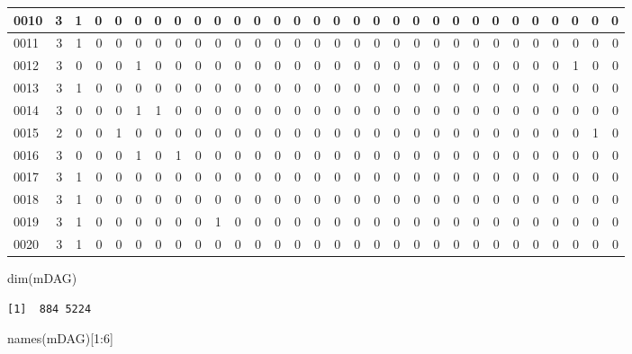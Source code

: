 \documentclass[
  letterpaper,
  DIV=11,
  numbers=noendperiod]{scrreprt}
\newenvironment{Shaded}{\begin{snugshade}}{\end{snugshade}}
\newcommand{\DecValTok}[1]{\textcolor[rgb]{0.68,0.00,0.00}{#1}}
\newcommand{\FunctionTok}[1]{\textcolor[rgb]{0.28,0.35,0.67}{#1}}
\newcommand{\NormalTok}[1]{\textcolor[rgb]{0.00,0.23,0.31}{#1}}
\newcommand{\SpecialCharTok}[1]{\textcolor[rgb]{0.37,0.37,0.37}{#1}}
\begin{document}
\begin{tabular}{l|r|r|r|r|r|r|r|r|r|r|r|r|r|r|r|r|r|r|r|r|r|r|r|r|r|r|r|r|r}
\hline
0010 & 3 & 1 & 0 & 0 & 0 & 0 & 0 & 0 & 0 & 0 & 0 & 0 & 0 & 0 & 0 & 0 & 0 & 0 & 0 & 0 & 0 & 0 & 0 & 0 & 0 & 0 & 0 & 0 & 0\\
\hline
0011 & 3 & 1 & 0 & 0 & 0 & 0 & 0 & 0 & 0 & 0 & 0 & 0 & 0 & 0 & 0 & 0 & 0 & 0 & 0 & 0 & 0 & 0 & 0 & 0 & 0 & 0 & 0 & 0 & 0\\
\hline
0012 & 3 & 0 & 0 & 0 & 1 & 0 & 0 & 0 & 0 & 0 & 0 & 0 & 0 & 0 & 0 & 0 & 0 & 0 & 0 & 0 & 0 & 0 & 0 & 0 & 0 & 0 & 1 & 0 & 0\\
\hline
0013 & 3 & 1 & 0 & 0 & 0 & 0 & 0 & 0 & 0 & 0 & 0 & 0 & 0 & 0 & 0 & 0 & 0 & 0 & 0 & 0 & 0 & 0 & 0 & 0 & 0 & 0 & 0 & 0 & 0\\
\hline
0014 & 3 & 0 & 0 & 0 & 1 & 1 & 0 & 0 & 0 & 0 & 0 & 0 & 0 & 0 & 0 & 0 & 0 & 0 & 0 & 0 & 0 & 0 & 0 & 0 & 0 & 0 & 0 & 0 & 0\\
\hline
0015 & 2 & 0 & 0 & 1 & 0 & 0 & 0 & 0 & 0 & 0 & 0 & 0 & 0 & 0 & 0 & 0 & 0 & 0 & 0 & 0 & 0 & 0 & 0 & 0 & 0 & 0 & 0 & 1 & 0\\
\hline
0016 & 3 & 0 & 0 & 0 & 1 & 0 & 1 & 0 & 0 & 0 & 0 & 0 & 0 & 0 & 0 & 0 & 0 & 0 & 0 & 0 & 0 & 0 & 0 & 0 & 0 & 0 & 0 & 0 & 0\\
\hline
0017 & 3 & 1 & 0 & 0 & 0 & 0 & 0 & 0 & 0 & 0 & 0 & 0 & 0 & 0 & 0 & 0 & 0 & 0 & 0 & 0 & 0 & 0 & 0 & 0 & 0 & 0 & 0 & 0 & 0\\
\hline
0018 & 3 & 1 & 0 & 0 & 0 & 0 & 0 & 0 & 0 & 0 & 0 & 0 & 0 & 0 & 0 & 0 & 0 & 0 & 0 & 0 & 0 & 0 & 0 & 0 & 0 & 0 & 0 & 0 & 0\\
\hline
0019 & 3 & 1 & 0 & 0 & 0 & 0 & 0 & 0 & 1 & 0 & 0 & 0 & 0 & 0 & 0 & 0 & 0 & 0 & 0 & 0 & 0 & 0 & 0 & 0 & 0 & 0 & 0 & 0 & 0\\
\hline
0020 & 3 & 1 & 0 & 0 & 0 & 0 & 0 & 0 & 0 & 0 & 0 & 0 & 0 & 0 & 0 & 0 & 0 & 0 & 0 & 0 & 0 & 0 & 0 & 0 & 0 & 0 & 0 & 0 & 0\\
\hline
\end{tabular}

\begin{Shaded}
\begin{Highlighting}[]
\FunctionTok{dim}\NormalTok{(mDAG)}
\end{Highlighting}
\end{Shaded}

\begin{verbatim}
[1]  884 5224
\end{verbatim}

\begin{Shaded}
\begin{Highlighting}[]
\FunctionTok{names}\NormalTok{(mDAG)[}\DecValTok{1}\SpecialCharTok{:}\DecValTok{6}\NormalTok{]}
\end{Highlighting}
\end{Shaded}
\end{document}

